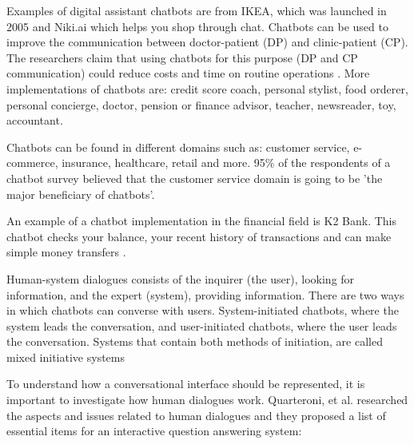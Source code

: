 Examples of digital assistant chatbots are from IKEA, which was launched in 2005 and Niki.ai which helps you shop through chat. Chatbots can be used to improve the communication between doctor-patient (DP) and clinic-patient (CP). The researchers claim that using chatbots for this purpose (DP and CP communication) could reduce costs and time on routine operations \cite{abashev2017}. More implementations of chatbots are: credit score coach, personal stylist, food orderer, personal concierge, doctor, pension or finance advisor, teacher, newsreader, toy, accountant.
% 
% 

Chatbots can be found in different domains such as: customer service, e-commerce, insurance, healthcare, retail and more. 95\% of the respondents of a chatbot survey believed that the customer service domain is going to be ’the major beneficiary of chatbots'.

An example of a chatbot implementation in the financial field is K2 Bank. This chatbot checks your balance, your recent history of transactions and can make simple money transfers \cite{k2bot}.

Human-system dialogues consists of the inquirer (the user), looking for information, and the expert (system), providing information. There are two ways in which chatbots can converse with users. System-initiated chatbots, where the system leads the conversation, and user-initiated chatbots, where the user leads the conversation. Systems that contain both methods of initiation, are called mixed initiative systems \cite{hung2009}
% 
% 
% 
% 

To understand how a conversational interface should be represented, it is important to investigate how human dialogues work. Quarteroni, et al. \cite{quarteroni2009} researched the aspects and issues related to human dialogues and they proposed a list of essential items for an interactive question answering system:
% 
% 
% 
% 

